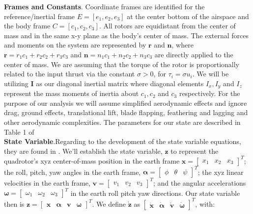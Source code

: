 \documentclass{article}
\begin{document}
\begin{multicols}{2}
\noindent \textbf{Frames and Constants}. Coordinate frames are identified for the reference/inertial frame $E={[e_1, e_2, e_3]}$ at the center bottom of the airspace and the 
body frame $C={[c_1, c_2, c_3]}$.  All rotors are equidistant from the center of mass and in the same x-y plane as the body's 
center of mass.  The external forces and moments on the system are represented by $\boldsymbol{r}$ and $\boldsymbol{n}$, where 
$\boldsymbol{r} = r_1 c_1 + r_2 c_2 + r_3 c_3$ and $\boldsymbol{n} = n_1 c_1 + n_2 c_2 + n_3 c_3$ are directly applied to the center 
of mass. We are assuming that the torque of the rotor is proportionally related to the input thrust via the constant $\sigma>0$, for $
\tau_i = \sigma u_i$. We will be utilizing $\boldsymbol{I}$ as our diagonal inertial matrix where diagonal elements  $I_x, I_y $ and 
$I_z$ represent the mass moments of inertia about $c_1, c_2 $ and $c_3$ respectively.  For the purpose of our analysis we will assume simplified aerodynamic effects and ignore 
 drag, ground effects, translational lift, blade flapping, feathering and lagging and other aerodynamic complexities. The parameters for our state are described in Table 1 of \cite{FaalP}\\

\noindent \textbf{State Variable}.Regarding to the development of the state variable equations, they are found in \cite{FaalD}. We'll establish the state variable, $\mathbf{z}$ to represent the quadrotor's xyz 
center-of-mass position in the earth 
frame $\mathbf{x}=\begin{bmatrix}x_1 & x_2 & x_3\end{bmatrix}^T$; the roll, pitch, yaw angles in the earth frame, $\bm{\alpha}
=\begin{bmatrix}\phi & \theta & \psi\end{bmatrix}^T$; the xyz linear velocities in the earth frame, $\mathbf{v}=\begin{bmatrix}v_1 & 
v_2 & v_3\end{bmatrix}^T$; and the angular accelerations $\bm{\omega}=\begin{bmatrix}\omega_1 & \omega_2 & 
\omega_3\end{bmatrix}^T$ in the earth roll pitch yaw directions. Our state variable then is $\mathbf{z}=\begin{bmatrix}\mathbf{x}
&\bm{\alpha}&\mathbf{v}&\bm{\omega}\end{bmatrix}^T$. We define $\boldsymbol{\dot{z}}$ as $\begin{bmatrix} \mathbf{\dot{x}}
&\bm{\dot{\alpha}}&\mathbf{\dot{v}}&\bm{\dot{\omega}} \end{bmatrix}^T$, with:


\end{multicols}
\end{document}
